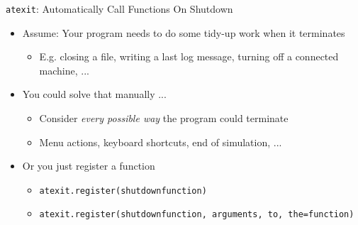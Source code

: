 
\begin{frame}{\texttt{atexit}: Automatically Call Functions On Shutdown}
%
\begin{itemize}
\item Assume: Your program needs to do some tidy-up work when it terminates
	\begin{itemize}
	\item E.\;g. closing a file, writing a last log message, turning off a connected machine, ...
	\end{itemize}
\item You could solve that manually ...
	\begin{itemize}
	\item Consider \emph{every possible way} the program could terminate
	\item Menu actions, keyboard shortcuts, end of simulation, ...
	\end{itemize}
\item Or you just register a function
	\begin{itemize}
	\item \texttt{atexit.register(shutdownfunction)}
	\item \texttt{atexit.register(shutdownfunction, arguments, to, the=function)}
	\end{itemize}
\end{itemize}
%
\end{frame}